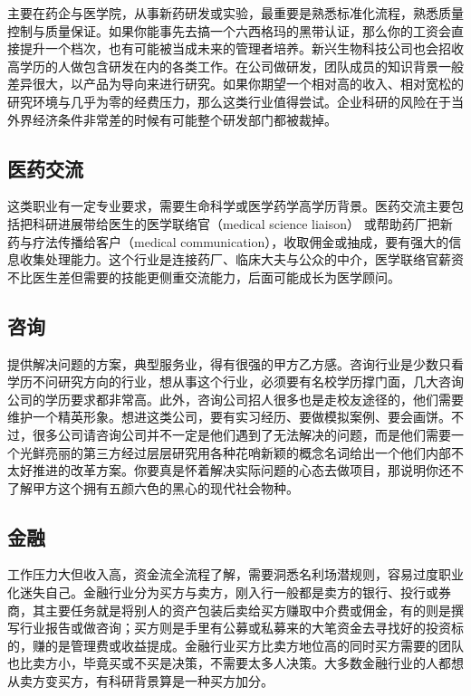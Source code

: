 \documentclass[]{tufte-book}
\begin{document}
主要在药企与医学院，从事新药研发或实验，最重要是熟悉标准化流程，熟悉质量控制与质量保证。如果你能事先去搞一个六西格玛的黑带认证，那么你的工资会直接提升一个档次，也有可能被当成未来的管理者培养。新兴生物科技公司也会招收高学历的人做包含研发在内的各类工作。在公司做研发，团队成员的知识背景一般差异很大，以产品为导向来进行研究。如果你期望一个相对高的收入、相对宽松的研究环境与几乎为零的经费压力，那么这类行业值得尝试。企业科研的风险在于当外界经济条件非常差的时候有可能整个研发部门都被裁掉。

\hypertarget{ux533bux836fux4ea4ux6d41}{%
\subsection{医药交流}\label{ux533bux836fux4ea4ux6d41}}

这类职业有一定专业要求，需要生命科学或医学药学高学历背景。医药交流主要包括把科研进展带给医生的医学联络官（medical science liaison）
或帮助药厂把新药与疗法传播给客户（medical communication），收取佣金或抽成，要有强大的信息收集处理能力。这个行业是连接药厂、临床大夫与公众的中介，医学联络官薪资不比医生差但需要的技能更侧重交流能力，后面可能成长为医学顾问。

\hypertarget{ux54a8ux8be2}{%
\subsection{咨询}\label{ux54a8ux8be2}}

提供解决问题的方案，典型服务业，得有很强的甲方乙方感。咨询行业是少数只看学历不问研究方向的行业，想从事这个行业，必须要有名校学历撑门面，几大咨询公司的学历要求都非常高。此外，咨询公司招人很多也是走校友途径的，他们需要维护一个精英形象。想进这类公司，要有实习经历、要做模拟案例、要会画饼。不过，很多公司请咨询公司并不一定是他们遇到了无法解决的问题，而是他们需要一个光鲜亮丽的第三方经过层层研究用各种花哨新颖的概念名词给出一个他们内部不太好推进的改革方案。你要真是怀着解决实际问题的心态去做项目，那说明你还不了解甲方这个拥有五颜六色的黑心的现代社会物种。

\hypertarget{ux91d1ux878d}{%
\subsection{金融}\label{ux91d1ux878d}}

工作压力大但收入高，资金流全流程了解，需要洞悉名利场潜规则，容易过度职业化迷失自己。金融行业分为买方与卖方，刚入行一般都是卖方的银行、投行或券商，其主要任务就是将别人的资产包装后卖给买方赚取中介费或佣金，有的则是撰写行业报告或做咨询；买方则是手里有公募或私募来的大笔资金去寻找好的投资标的，赚的是管理费或收益提成。金融行业买方比卖方地位高的同时买方需要的团队也比卖方小，毕竟买或不买是决策，不需要太多人决策。大多数金融行业的人都想从卖方变买方，有科研背景算是一种买方加分。
\end{document}
